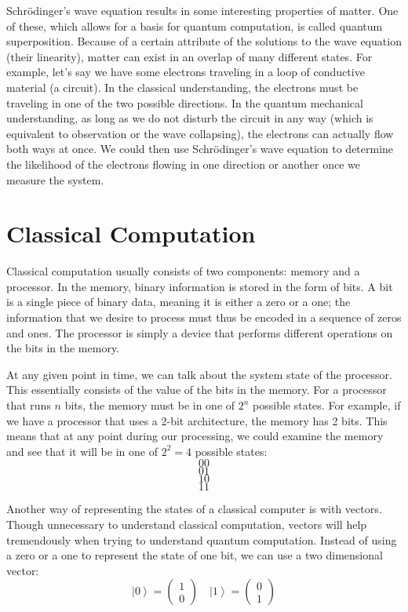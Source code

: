\documentclass[11pt]{report}
\newcommand{\?}{\stackrel{?}{=}}
\begin{document}
Schrödinger's wave equation results in some interesting properties of matter. One of these, which allows for a basis for quantum computation, is called quantum superposition. Because of a certain attribute of the solutions to the wave equation (their linearity), matter can exist in an overlap of many different states. For example, let's say we have some electrons traveling in a loop of conductive material (a circuit). In the classical understanding, the electrons must be traveling in one of the two possible directions. In the quantum mechanical understanding, as long as we do not disturb the circuit in any way (which is equivalent to observation or the wave collapsing), the electrons can actually flow both ways at once. We could then use Schrödinger's wave equation to determine the likelihood of the electrons flowing in one direction or another once we measure the system.

\section{Classical Computation}
Classical computation usually consists of two components: memory and a processor. In the memory, binary information is stored in the form of bits. A bit is a single piece of binary data, meaning it is either a zero or a one; the information that we desire to process must thus be encoded in a sequence of zeros and ones. The processor is simply a device that performs different operations on the bits in the memory.

At any given point in time, we can talk about the system state of the processor. This essentially consists of the value of the bits in the memory. For a processor that runs $n$ bits, the memory must be in one of $2^n$ possible states. For example, if we have a processor that uses a 2-bit architecture, the memory has 2 bits. This means that at any point during our processing, we could examine the memory and see that it will be in one of $2^2=4$ possible states:
$$00$$
$$01$$
$$10$$
$$11$$

Another way of representing the states of a classical computer is with vectors. Though unnecessary to understand classical computation, vectors will help tremendously when trying to understand quantum computation. Instead of using a zero or a one to represent the state of one bit, we can use a two dimensional vector:
$$\left | 0 \right \rangle=\begin{pmatrix}1\\ 0\end{pmatrix} \quad \left | 1 \right \rangle=\begin{pmatrix}0\\ 1\end{pmatrix}$$
             
\end{document}
